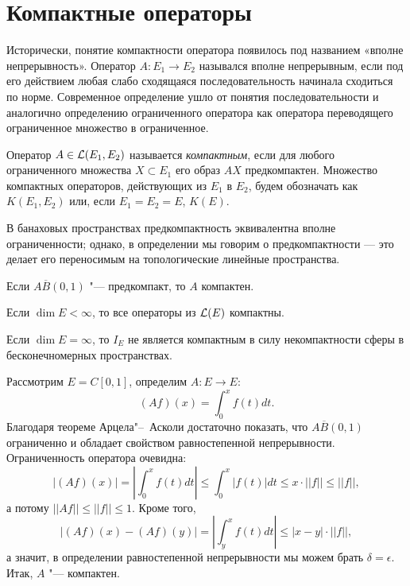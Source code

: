 \documentclass[main]{subfiles}
\begin{document}
\section{Компактные операторы}

Исторически, понятие компактности оператора
появилось под названием «вполне непрерывность».
Оператор \( A : E_1 \to E_2 \)
назывался вполне непрерывным, если
под его действием любая слабо сходящаяся последовательность
начинала сходиться по норме.
Современное определение ушло от понятия последовательности
и аналогично определению ограниченного оператора
как оператора переводящего ограниченное множество в ограниченное.

\begin{definition}
  Оператор \( A \in \Linears{E_1, E_2} \)
  называется \emph{компактным}, если
  для любого ограниченного множества \( X \subset E_1 \)
  его образ \( A X \) предкомпактен.
  Множество компактных операторов, действующих
  из \( E_1 \) в \( E_2 \), будем обозначать как
  \( K(E_1, E_2) \) или, если \( E_1 = E_2 = E \),
  \( K(E) \).
\end{definition}

\begin{remark}
  В банаховых пространствах
  предкомпактность эквивалентна вполне ограниченности;
  однако, в определении мы говорим о предкомпактности —
  это делает его переносимым на топологические линейные пространства.
\end{remark}

\begin{exercise}
  Если \( A \overline{B}(0, 1) \) "--- предкомпакт,
  то \( A \) компактен.
\end{exercise}

\begin{exampleslist}
  \item Если \( \dim E < \infty \), то все операторы из
    \( \Linears{E} \) компактны.
  \item Если \( \dim E = \infty \), то \( I_E \) не является компактным
    в силу некомпактности сферы в бесконечномерных пространствах.
  \item
    Рассмотрим \( E = C[0, 1] \), определим \( A : E \to E \):
    \[
      (Af)(x) = \int_0^x f(t) dt.
    \]
    Благодаря теореме Арцела"--~Асколи достаточно показать, что
    \( A \overline{B}(0, 1) \) ограниченно и обладает
    свойством равностепенной непрерывности.
    Ограниченность оператора очевидна:
    \[
      |(Af)(x)| = |\int_0^x f(t) dt| \le
      \int_0^x |f(t)| dt \le x \cdot ||f|| \le ||f||,
    \]
    а потому \( ||Af|| \le ||f|| \le 1 \).
    Кроме того,
    \[
      |(Af)(x) - (Af)(y)| =
      \left|\int_y^x f(t) dt \right| \le |x - y| \cdot ||f||,
    \]
    а значит, в определении равностепенной непрерывности
    мы можем брать \( \delta = \epsilon \).
    Итак, \( A \) "--- компактен.
\end{exampleslist}
\end{document}
